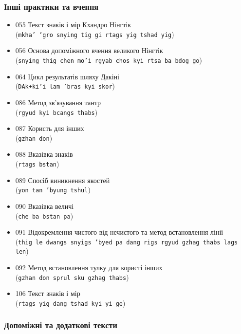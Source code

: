 \documentclass{article}
\begin{document}
\subsubsection{Інші практики та вчення}

\begingroup\raggedright
\begin{itemize}
\item 055 Текст знаків і мір Кхандро Нінгтік \\ (\texttt{mkha' 'gro snying tig gi rtags yig tshad yig})
\item 056 Основа допоміжного вчення великого Нінгтік \\ (\texttt{snying thig chen mo'i rgyab chos kyi rtsa ba bdog go})
\item 064 Цикл результатів шляху Дакіні \\ (\texttt{DAk+ki'i lam 'bras kyi skor})
\item 086 Метод зв’язування тантр \\ (\texttt{rgyud kyi bcangs thabs})
\item 087 Користь для інших \\ (\texttt{gzhan don})
\item 088 Вказівка знаків \\ (\texttt{rtags bstan})
\item 089 Спосіб виникнення якостей \\ (\texttt{yon tan 'byung tshul})
\item 090 Вказівка величі \\ (\texttt{che ba bstan pa})
\item 091 Відокремлення чистого від нечистого та метод встановлення лінії \\ (\texttt{thig le dwangs snyigs 'byed pa dang rigs rgyud gzhag thabs lags len})
\item 092 Метод встановлення тулку для користі інших \\ (\texttt{gzhan don sprul sku gzhag thabs})
\item 106 Текст знаків і мір \\ (\texttt{rtags yig dang tshad kyi yi ge})
\end{itemize}
\endgroup

\subsubsection{Допоміжні та додаткові тексти}
\end{document}
